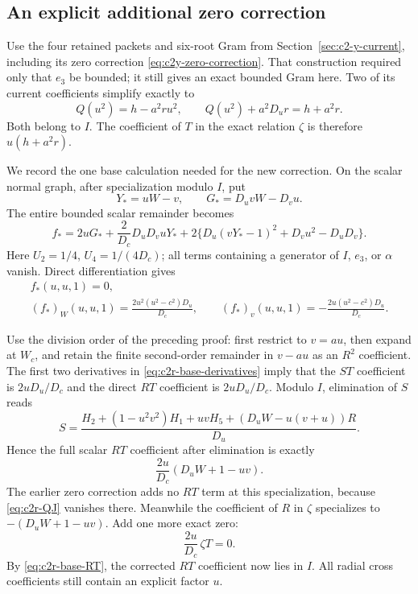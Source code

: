 \subsection{An explicit additional zero correction}
Use the four retained packets and six-root Gram from
Section~\ref{sec:c2-y-current}, including its zero correction
\eqref{eq:c2y-zero-correction}.  That construction required only that
$e_3$ be bounded; it still gives an exact bounded Gram here.  Two of its
current coefficients simplify exactly to
\begin{equation}
Q(u^2)=h-a^2ru^2,\qquad Q(u^2)+a^2D_ur=h+a^2r.
\label{eq:c2r-QJ}
\end{equation}
Both belong to $I$.  The coefficient of $T$ in the exact relation
$\zeta$ is therefore $u(h+a^2r)$.

We record the one base calculation needed for the new correction.
On the scalar normal graph, after specialization modulo $I$, put
\[
Y_*=uW-v,\qquad G_*=D_uvW-D_vu.
\]
The entire bounded scalar remainder becomes
\begin{equation}
f_*=2uG_*+\frac{2}{D_c}D_uD_vuY_*
 +2\{D_u(vY_*-1)^2+D_vu^2-D_uD_v\}.
\label{eq:c2r-base-polynomial}
\end{equation}
Here $U_2=1/4$, $U_4=1/(4D_c)$; all terms containing a generator of
$I$, $e_3$, or $\alpha$ vanish.  Direct differentiation gives
\begin{equation}
\begin{gathered}
f_*(u,u,1)=0,\\
(f_*)_W(u,u,1)=\frac{2u^2(u^2-c^2)D_u}{D_c},\qquad
(f_*)_v(u,u,1)=-\frac{2u(u^2-c^2)D_u}{D_c}.
\end{gathered}
\label{eq:c2r-base-derivatives}
\end{equation}

Use the division order of the preceding proof: first restrict to $v=au$,
then expand at $W_c$, and retain the finite second-order remainder in
$v-au$ as an $R^2$ coefficient.  The first two derivatives in
\eqref{eq:c2r-base-derivatives} imply that the $ST$ coefficient is
$2uD_u/D_c$ and the direct $RT$ coefficient is $2uD_u/D_c$.
Modulo $I$, elimination of $S$ reads
\[
S=\frac{H_2+(1-u^2v^2)H_1+uvH_5
 +(D_uW-u(v+u))R}{D_u}.
\]
Hence the full scalar $RT$ coefficient after elimination is exactly
\begin{equation}
\frac{2u}{D_c}(D_uW+1-uv).
\label{eq:c2r-base-RT}
\end{equation}
The earlier zero correction adds no $RT$ term at this specialization,
because \eqref{eq:c2r-QJ} vanishes there.  Meanwhile the coefficient of
$R$ in $\zeta$ specializes to $-(D_uW+1-uv)$.  Add one more exact zero:
\begin{equation}
\frac{2u}{D_c}\,\zeta T=0.
\label{eq:c2r-final-correction}
\end{equation}
By \eqref{eq:c2r-base-RT}, the corrected $RT$ coefficient now lies in
$I$.  All radial cross coefficients still contain an explicit factor $u$.

